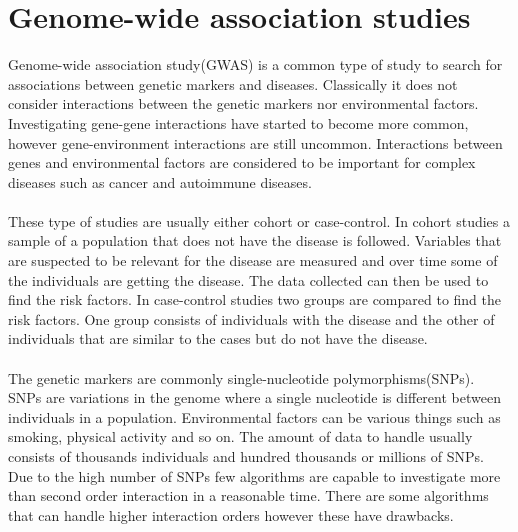 \documentclass[10pt,a4paper]{report}
\begin{document}
\section{Genome-wide association studies}
Genome-wide association study(GWAS) is a common type of study to search for associations between genetic markers and diseases. Classically it does not consider interactions between the genetic markers nor environmental factors. Investigating gene-gene interactions have started to become more common\cite{cordell_detect_review}, however gene-environment interactions are still uncommon\cite{gene_enviroment_2013}. Interactions between genes and environmental factors are considered to be important for complex diseases such as cancer and autoimmune diseases.\cite{cordell_detect_review, gene_enviroment_2013, geira, ra_smoking}\\
\\
These type of studies are usually either cohort or case-control. In cohort studies a sample of a population that does not have the disease is followed. Variables that are suspected to be relevant for the disease are measured and over time some of the individuals are getting the disease. The data collected can then be used to find the risk factors. In case-control studies two groups are compared to find the risk factors. One group consists of individuals with the disease and the other of individuals that are similar to the cases but do not have the disease.\cite{rothman1998modern,mann_observational}\\
\\
The genetic markers are commonly single-nucleotide polymorphisms(SNPs). SNPs are variations in the genome where a single nucleotide is different between individuals in a population\cite{fareed_snp}. Environmental factors can be various things such as smoking, physical activity and so on. The amount of data to handle usually consists of thousands individuals and hundred thousands or millions of SNPs. Due to the high number of SNPs few algorithms are capable to investigate more than second order interaction in a reasonable time. There are some algorithms that can handle higher interaction orders however these have drawbacks\cite{gwis,high_order_2012,fast_high_order_cluster}.
\end{document}
